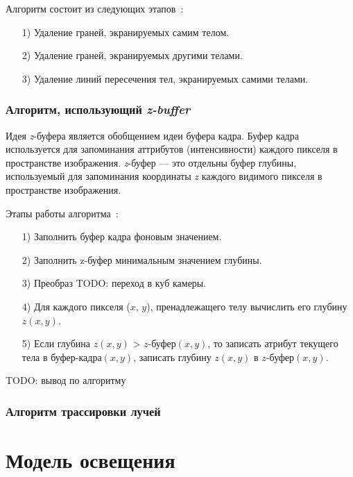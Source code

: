    Алгоритм состоит из следующих этапов~\cite{rogers}:
   \begin{enumerate}
   	\item[1)] Удаление граней, экранируемых самим телом.
   	\item[2)] Удаление граней, экранируемых другими телами.
   	\item[3)] Удаление линий пересечения тел, экранируемых самими телами.
   \end{enumerate}
   
   \subsubsection{Алгоритм, использующий \textit{z-buffer}}
   
   Идея \textit{z}-буфера является обобщением идеи буфера кадра. Буфер кадра используется для запоминания аттрибутов (интенсивности) каждого пикселя в пространстве изображения. \textit{z}-буфер --- это отдельны буфер глубины, используемый для запоминания координаты \textit{z} каждого видимого пикселя в пространстве изображения\cite{rogers}.
   
   Этапы работы алгоритма~\cite{rogers}:
   
   \begin{enumerate}
   	\item[1)] Заполнить буфер кадра фоновым значением.
   	\item[2)] Заполнить z-буфер минимальным значением глубины.
   	\item[3)] Преобраз TODO: переход в куб камеры.
   	\item[4)] Для каждого пикселя ($x$, $y$), пренадлежащего телу вычислить его глубину $z(x, y)$.
   	\item[5)] Если глубина $z(x, y)$ > $z\textit{-буфер}(x, y)$, то записать атрибут текущего тела в $\textit{буфер-кадра}(x, y)$, записать глубину $z(x, y)$ в $z\textit{-буфер}(x, y)$.
   \end{enumerate}
   
   TODO: вывод по алгоритму
    
    \subsubsection{Алгоритм трассировки лучей}
    
    
    \section{Модель освещения}
    
